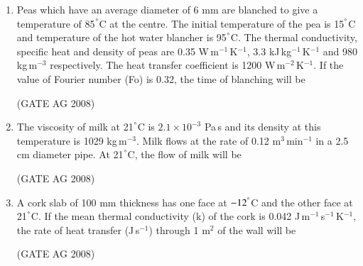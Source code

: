 \documentclass[journal]{IEEEtran}
\begin{document}
\begin{enumerate}
\medskip


\item 
 Peas which have an average diameter of 6 mm are blanched to give a temperature of 85${}^ \degree$C at the centre. The initial temperature of the pea is 15${}^ \degree$C and temperature of the hot water blancher is 95${}^ \degree$C. The thermal conductivity, specific heat and density of peas are 0.35 W\,m$^{-1}$\,K$^{-1}$, 3.3 kJ\,kg$^{-1}$\,K$^{-1}$ and 980 kg\,m$^{-3}$ respectively. The heat transfer coefficient is 1200 W\,m$^{-2}$\,K$^{-1}$. If the value of Fourier number (Fo) is 0.32, the time of blanching will be
\begin{enumerate}
\end{enumerate}
\hfill(GATE AG 2008)\\

\medskip

\item 
 The viscosity of milk at 21${}^ \degree$C is $2.1 \times 10^{-3}$ Pa\,s and its density at this temperature is 1029 kg\,m$^{-3}$. Milk flows at the rate of 0.12 m$^3$\,min$^{-1}$ in a 2.5 cm diameter pipe. At 21${}^ \degree$C, the flow of milk will be
\begin{enumerate}
\end{enumerate}
\hfill(GATE AG 2008)\\

\medskip

\item 
 A cork slab of 100 mm thickness has one face at $-12^ \degree$C and the other face at 21${}^ \degree$C. If the mean thermal conductivity (k) of the cork is 0.042 J\,m$^{-1}$\,s$^{-1}$\,K$^{-1}$, the rate of heat transfer (J\,s$^{-1}$) through 1 m$^2$ of the wall will be
\begin{enumerate}
\end{enumerate}
\hfill(GATE AG 2008)\\


\end{enumerate}
\end{document}
